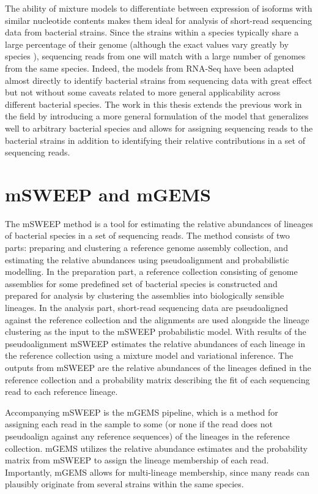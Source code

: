 \documentclass[officiallayout]{tktla}
\begin{document}
The ability of mixture models to differentiate between expression of
isoforms with similar nucleotide contents makes them ideal for
analysis of short-read sequencing data from bacterial strains. Since
the strains within a species typically share a large percentage of
their genome (although the exact values vary greatly by species
\citep{doolittle2006genomics, van2020diversity}), sequencing reads
from one will match with a large number of genomes from the same
species. Indeed, the models from RNA-Seq have been adapted almost
directly to identify bacterial strains from sequencing data
\citep{sankar2016bayesian} with great effect but not without some
caveats related to more general applicability across different
bacterial species. The work in this thesis extends the previous work
in the field \citep{sankar2016bayesian} by introducing a more general
formulation of the model that generalizes well to arbitrary bacterial
species and allows for assigning sequencing reads to the bacterial
strains in addition to identifying their relative contributions in a
set of sequencing reads.

\section{mSWEEP and mGEMS}

The mSWEEP method is a tool for estimating the relative abundances of
lineages of bacterial species in a set of sequencing reads. The method
consists of two parts: preparing and clustering a reference genome
assembly collection, and estimating the relative abundances using
pseudoalignment \citep{bray2016near} and probabilistic modelling. In
the preparation part, a reference collection consisting of genome
assemblies for some predefined set of bacterial species is constructed
and prepared for analysis by clustering the assemblies into
biologically sensible lineages. In the analysis part, short-read
sequencing data are pseudoaligned against the reference collection and
the alignments are used alongside the lineage clustering as the input to
the mSWEEP probabilistic model. With results of the pseudoalignment
mSWEEP estimates the relative abundances of each lineage in the
reference collection using a mixture model and variational
inference. The outputs from mSWEEP are the relative abundances of the
lineages defined in the reference collection and a probability matrix
describing the fit of each sequencing read to each reference lineage.

Accompanying mSWEEP is the mGEMS pipeline, which is a method for
assigning each read in the sample to some (or none if the read does
not pseudoalign against any reference sequences) of the lineages in
the reference collection. mGEMS utilizes the relative abundance
estimates and the probability matrix from mSWEEP to assign the lineage
membership of each read. Importantly, mGEMS allows for multi-lineage
membership, since many reads can plausibly originate from several
strains within the same species.
\end{document}
